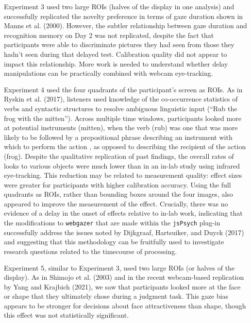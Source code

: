 \documentclass[
  man,floatsintext]{apa6}
\begin{document}
Experiment 3 used two large ROIs (halves of the display in one analysis) and successfully replicated the novelty preference in terms of gaze duration shown in Manns et al. (2000). However, the subtler relationship between gaze duration and recognition memory on Day 2 was not replicated, despite the fact that participants were able to discriminate pictures they had seen from those they hadn't seen during that delayed test. Calibration quality did not appear to impact this relationship. More work is needed to understand whether delay manipulations can be practically combined with webcam eye-tracking.

Experiment 4 used the four quadrants of the participant's screen as ROIs. As in Ryskin et al. (2017), listeners used knowledge of the co-occurrence statistics of verbs and syntactic structures to resolve ambiguous linguistic input (``Rub the frog with the mitten''). Across multiple time windows, participants looked more at potential instruments (mitten), when the verb (rub) was one that was more likely to be followed by a prepositional phrase describing an instrument with which to perform the action , as opposed to describing the recipient of the action (frog). Despite the qualitative replication of past findings, the overall rates of looks to various objects were much lower than in an in-lab study using infrared eye-tracking. This reduction may be related to measurement quality: effect sizes were greater for participants with higher calibration accuracy. Using the full quadrants as ROIs, rather than bounding boxes around the four images, also appeared to improve the measurement of the effect. Crucially, there was no evidence of a delay in the onset of effects relative to in-lab work, indicating that the modifications to \texttt{webgazer} that are made within the \texttt{jsPsych} plug-in successfully address the issues noted by Dijkgraaf, Hartsuiker, and Duyck (2017) and suggesting that this methodology can be fruitfully used to investigate research questions related to the timecourse of processing.

Experiment 5, similar to Experiment 3, used two large ROIs (or halves of the display). As in Shimojo et al. (2003) and in the recent webcam-based replication by Yang and Krajbich (2021), we saw that participants looked more at the face or shape that they ultimately chose during a judgment task. This gaze bias appears to be stronger for decisions about face attractiveness than shape, though this effect was not statistically significant.
\end{document}
